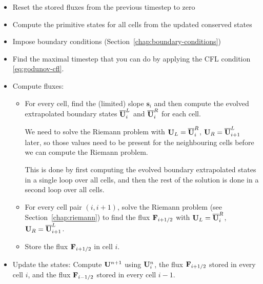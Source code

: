 \begin{itemize}

\item Reset the stored fluxes from the previous timestep to zero

\item Compute the primitive states for all cells from the updated conserved
states

\item Impose boundary conditions (Section~\ref{chap:boundary-conditions})

\item Find the maximal timestep that you can do by applying the CFL condition
\ref{eq:godunov-cfl}.

\item Compute fluxes:

\begin{itemize}
\item For every cell, find the (limited) slope $\mathbf{s}_i$ and then compute
the evolved extrapolated boundary states $\overline{\mathbf{U}}_i^L$ and
$\overline{\mathbf{U}}_i^R$ for each cell.

We need to solve the Riemann problem with
$\mathbf{U}_L = \overline{\mathbf{U}}_i^R$, $\mathbf{U}_R = \overline{\mathbf{U}}_{i+1}^L$
later, so those values need to be present for the neighbouring cells before we
can compute the Riemann problem.

This is done by first computing the evolved boundary
extrapolated states in a single loop over all cells, and then the rest of the
solution is done in a second loop over all cells.

\item For every cell pair $(i, i+1)$, solve the Riemann problem (see
Section~\ref{chap:riemann}) to find the flux $\mathbf{F}_{i+1/2}$ with $\mathbf{U}_L =
\overline{\mathbf{U}}_i^R$, $\mathbf{U}_R = \overline{\mathbf{U}}_{i+1}^L$.

\item Store the flux $\mathbf{F}_{i+1/2}$ in cell $i$.

\end{itemize}

\item Update the states: Compute $\mathbf{U}^{n+1}$ using $\mathbf{U}_i^n$, the
flux $\mathbf{F}_{i+1/2}$ stored in every cell $i$, and the flux $\mathbf{F}_{i-1/2}$
stored in every cell $i-1$.

\end{itemize}
